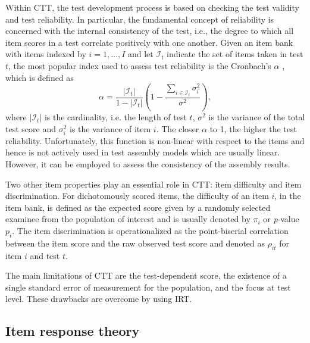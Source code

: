Within CTT, the test development process is based on checking the test validity and test reliability.
In particular, the fundamental concept of reliability is concerned with the internal consistency of the test, i.e., the degree to which all item scores in a test correlate positively with one another.
Given an item bank with items indexed by $i=1,\ldots,I$ and let $\mathcal{I}_t$ indicate the set of items taken in test $t$, the most popular index used to assess test reliability is the Cronbach's $\alpha$ \textcite{cronbach1951coefficient}, which is defined as
\begin{equation}
\alpha= \frac{|\mathcal{I}_t|}{1-|\mathcal{I}_t|}\left(1- \frac{\sum_{i \in \mathcal{I}_t}\sigma^2_i}{\sigma^2} \right),
\end{equation}
where $|\mathcal{I}_t|$ is the cardinality, i.e. the length of test $t$, $\sigma^2$ is the variance of the total test score and $\sigma^2_i$ is the variance of item $i$.
The closer $\alpha$ to 1, the higher the test reliability.
Unfortunately, this function is non-linear with respect to the items and hence is not actively used in test assembly models which are usually linear.
However, it can be employed to assess the consistency of the assembly results.

Two other item properties play an essential role in CTT: item difficulty and item discrimination.
For dichotomously scored items, the difficulty of an item  $i$, in the item bank, is defined as the expected score given by a randomly selected examinee from the population of interest and is usually denoted by $\pi_i$ or \textit{p}-value $p_i$.
The item discrimination is operationalized as the point-biserial correlation between the item score and the raw observed test score and denoted as $\rho_{it}$ for item $i$ and test $t$.

The main limitations of CTT are the test-dependent score, the existence of a single standard error of measurement for the population, and the focus at test level.
These drawbacks are overcome by using IRT.

\subsection{Item response theory}\label{sec:irt}

